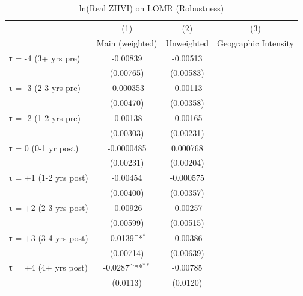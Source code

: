 \begin{table}[htbp]\centering
\def\sym#1{\ifmmode^{#1}\else\(^{#1}\)\fi}
\caption{ln(Real ZHVI) on LOMR (Robustness)}
\label{tab:robustness}
\begin{tabular}{l*{3}{c}}
\hline\hline
                    &\multicolumn{1}{c}{(1)}&\multicolumn{1}{c}{(2)}&\multicolumn{1}{c}{(3)}\\
                    &\multicolumn{1}{c}{Main (weighted)}&\multicolumn{1}{c}{Unweighted}&\multicolumn{1}{c}{Geographic Intensity}\\
\hline
τ = -4 (3+ yrs pre) &    -0.00839         &    -0.00513         &                     \\
                    &   (0.00765)         &   (0.00583)         &                     \\
[0.15em]
τ = -3 (2-3 yrs pre)&   -0.000353         &    -0.00113         &                     \\
                    &   (0.00470)         &   (0.00358)         &                     \\
[0.15em]
τ = -2 (1-2 yrs pre)&    -0.00138         &    -0.00165         &                     \\
                    &   (0.00303)         &   (0.00231)         &                     \\
[0.15em]
τ = 0 (0-1 yr post) &  -0.0000485         &    0.000768         &                     \\
                    &   (0.00231)         &   (0.00204)         &                     \\
[0.15em]
τ = +1 (1-2 yrs post)&    -0.00454         &   -0.000575         &                     \\
                    &   (0.00400)         &   (0.00357)         &                     \\
[0.15em]
τ = +2 (2-3 yrs post)&    -0.00926         &    -0.00257         &                     \\
                    &   (0.00599)         &   (0.00515)         &                     \\
[0.15em]
τ = +3 (3-4 yrs post)&     -0.0139\sym{*}  &    -0.00386         &                     \\
                    &   (0.00714)         &   (0.00639)         &                     \\
[0.15em]
τ = +4 (4+ yrs post)&     -0.0287\sym{**} &    -0.00785         &                     \\
                    &    (0.0113)         &    (0.0120)         &                     \\

\end{tabular}
\end{table}
